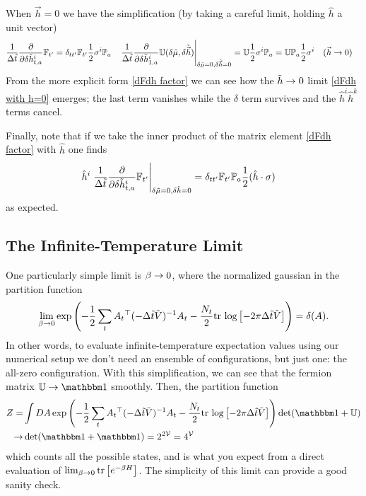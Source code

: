 When $\vec{h}=0$ we have the simplification (by taking a careful limit, holding $\hat{h}$ a unit vector)
\begin{align}
	\frac{1}{\Delta\tilde{t}} \frac{\partial}{\partial \delta\tilde{h}^i_{t,a}} \mathbb{F}_{t'} &= \delta_{tt'} \mathbb{F}_{t'} \frac{1}{2} \sigma^i \mathbb{P}_a
	&
	\left.\frac{1}{\Delta\tilde{t}} \frac{\partial}{\partial \delta\tilde{h}^i_{1,a}} \mathbb{U}(\delta\tilde{\mu}, \delta\tilde{\vec{h}})\right|_{\delta\tilde{\mu}=0, \delta\tilde{\vec{h}}=0}
	&= \mathbb{U} \frac{1}{2} \sigma^i \mathbb{P}_a = \mathbb{U} \mathbb{P}_a \frac{1}{2}\sigma^i 
	&
	(\vec{h} &\rightarrow 0)
	\label{eq:dFdh with h=0}
\end{align}
From the more explicit form \eqref{dFdh factor} we can see how the $\tilde{h}\rightarrow0$ limit \eqref{dFdh with h=0} emerges; the last term vanishes while the $\delta$ term survives and the $\hat{h}^i\hat{h}^k$ terms cancel.

Finally, note that if we take the inner product of the matrix element \eqref{dFdh factor} with $\hat{h}$ one finds
\begin{align}
	\hat{h}^i \left.\frac{1}{\Delta\tilde{t}}\frac{\partial}{\partial \delta \tilde{h}^i_{t,a}} \mathbb{F}_{t'}\right|_{\delta\tilde{\mu} = 0, \delta \tilde{h}=0}
	&= \delta_{tt'} \mathbb{F}_{t'} \mathbb{P}_a \frac{1}{2}(\hat{h}\cdot\sigma)
\end{align}
as expected.

\subsection{The Infinite-Temperature Limit}\label{sec:infinite temperature}

One particularly simple limit is $\beta\rightarrow0$, where the normalized gaussian in the partition function
\begin{align}
	\lim_{\beta\rightarrow0} \exp\left(-\frac{1}{2} \sum_t A_t{}^{\top} (-\Delta\tilde{t}\tilde{V})^{-1} A_t - \frac{N_t}{2} \text{tr log}\left[ -2\pi \Delta\tilde{t}\tilde{V} \right]\right)
	=
	\delta( A ).
\end{align}
In other words, to evaluate infinite-temperature expectation values using our numerical setup we don't need an ensemble of configurations, but just one: the all-zero configuration.
With this simplification, we can see that the fermion matrix $\UU \goesto \one$ smoothly.
Then, the partition function
\begin{align}
	Z
	=&
	\int DA \exp\left(-\half \sum_t A_t\transpose (-\Delta\tilde{t}\tilde{V})\inverse A_t - \frac{N_t}{2} \trlog{ -2\pi \Delta\tilde{t}\tilde{V} }\right) \det(\one+\UU)
	\nonumber\\
	\goesto&
	\det(\one+\one) = 2^{2\Volume} = 4^\Volume
\end{align}
which counts all the possible states, and is what you expect from a direct evaluation of $\lim_{\beta\rightarrow0}\text{tr}\left[e^{-\beta H}\right]$.
The simplicity of this limit can provide a good sanity check.

